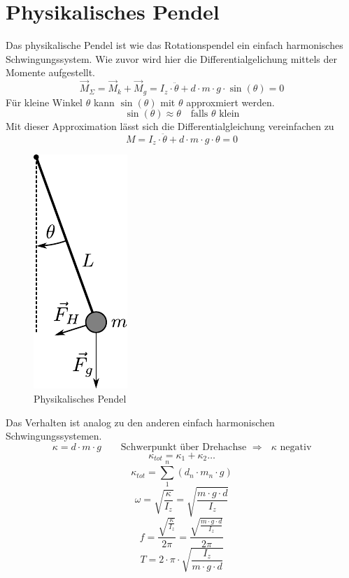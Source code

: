 \section{Physikalisches Pendel}
Das physikalische Pendel ist wie das Rotationspendel ein einfach harmonisches 
Schwingungssystem. Wie zuvor wird hier die Differentialgelichung mittels der
Momente aufgestellt. 
\[ \boxed{\vec{M}_{\Sigma} 
	= \vec{M}_k + \vec{M}_g	
	= I_z \cdot \ddot{\theta} + d \cdot m \cdot g \cdot \sin(\theta) = 0
} \]
Für kleine Winkel $\theta$ kann $\sin(\theta)$ mit $\theta$ approxmiert
werden.
\[ \boxed{ \sin(\theta) \approx \theta \quad\text{falls }\theta\text{ klein}
} \]
Mit dieser Approximation lässt sich die Differentialgleichung vereinfachen 
zu 
\[ \boxed{M 
	= I_z \cdot \ddot{\theta} + d \cdot m \cdot g \cdot \theta 
	= 0
} \]

\begin{figure}[h!]
	\centering
	\includegraphics[scale=0.75]{../fig/physikalisches-pendel.pdf}
	\caption{Physikalisches Pendel}
	\label{fig:physikalisches-pendel}
\end{figure}

Das Verhalten ist analog zu den anderen einfach harmonischen 
Schwingungssystemen.
\[ \boxed{\kappa = d \cdot m \cdot g} \qquad 
\text{Schwerpunkt über Drehachse $\Rightarrow$ $\kappa$ negativ} \]
\[ \boxed{\kappa_{tot} = \kappa_1 + \kappa_2 \dots} \]
\[ \boxed{\kappa_{tot} = \sum_{1}^{n} \left(d_n \cdot m_n \cdot g\right) } \]
\[ \boxed{\omega = \sqrt{\frac{\kappa}{I_z}} 
= \sqrt{\frac{m \cdot g \cdot d}{I_z}}} \]
\[ \boxed{f = \frac{\sqrt{\frac{\kappa}{I_z}}}{2 \pi}
= \frac{\sqrt{\frac{m \cdot g \cdot d}{I_z}}}{2 \pi}} \]
\[ \boxed{T = 2 \cdot \pi \cdot \sqrt{\frac{I_z}{m \cdot g \cdot d}}} \]

